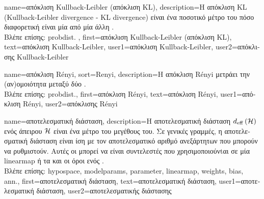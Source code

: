  {name={\foreignlanguage{greek}{απόκλιση} Kullback-Leibler (\foreignlanguage{greek}{απόκλιση} KL)}, 
 	description={\foreignlanguage{greek}{Η απόκλιση} 
		KL (Kullback-Leibler divergence - KL divergence) \foreignlanguage{greek}{είναι ένα ποσοτικό μέτρο του πόσο διαφορετική 
		είναι μία}  \foreignlanguage{greek}{από μία άλλη}  \cite{coverthomas}.\\
		\foreignlanguage{greek}{Βλέπε επίσης:} \gls{probdist}. },
 	first={\foreignlanguage{greek}{απόκλιση} Kullback-Leibler (\foreignlanguage{greek}{απόκλιση} KL)},
	text={\foreignlanguage{greek}{απόκλιση} Kullback-Leibler},
	user1={\foreignlanguage{greek}{απόκλιση} Kullback-Leibler}, %
  	user2={\foreignlanguage{greek}{απόκλισης} Kullback-Leibler} %
}

{name={\foreignlanguage{greek}{απόκλιση} R\'enyi}, 
	sort={Renyi},
	description={\foreignlanguage{greek}{Η απόκλιση} R\'enyi 
		\foreignlanguage{greek}{μετράει την (αν)ομοιότητα μεταξύ δύο}  \cite{RenyiInfo95}.\\
		\foreignlanguage{greek}{Βλέπε επίσης:} \gls{probdist}.}, 
	first={\foreignlanguage{greek}{απόκλιση} R\'enyi},
	text={\foreignlanguage{greek}{απόκλιση} R\'enyi},
	user1={\foreignlanguage{greek}{απόκλιση} R\'enyi}, %
	user2={\foreignlanguage{greek}{απόκλισης} R\'enyi} %
} 

{name={\foreignlanguage{greek}{αποτελεσματική διάσταση}},
	description={\foreignlanguage{greek}{Η αποτελεσματική διάσταση} 
		$d_{\rm eff} \left( \mathcal{H} \right)$ \foreignlanguage{greek}{ενός ά\-πειρου}  $\mathcal{H}$ \foreignlanguage{greek}{είναι ένα μέτρο του μεγέθους του. 
		Σε γενικές γραμμές, η αποτελεσματική διάσταση είναι ίση με τον αποτελεσματικό αριθμό ανεξάρτητων} 
		 \foreignlanguage{greek}{που μπορούν να ρυθμιστούν. Αυτές οι}
		 \foreignlanguage{greek}{μπορεί να είναι συντελεστές που χρησιμοποιούνtαι σε μία} \gls{linearmap} 
		\foreignlanguage{greek}{ή τα}  \foreignlanguage{greek}{και οι όροι}  \foreignlanguage{greek}{ενός} .\\
		\foreignlanguage{greek}{Βλέπε επίσης:} \gls{hypospace}, \gls{modelparams}, \gls{parameter}, \gls{linearmap}, \gls{weights}, \gls{bias}, \gls{ann}.},
	first={\foreignlanguage{greek}{αποτελεσματική διάσταση}},
	text={\foreignlanguage{greek}{αποτελεσματική διάσταση}},
	user1={\foreignlanguage{greek}{αποτελεσματική διάσταση}}, %
	user2={\foreignlanguage{greek}{αποτελεσματικής διάστασης}} %
}


